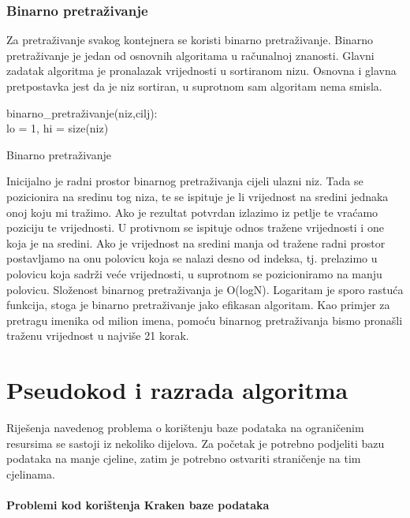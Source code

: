 \documentclass[times, utf8, zavrsni]{fer}
\begin{document}
{\subsection{Binarno pretraživanje}
Za pretraživanje svakog kontejnera se koristi binarno pretraživanje. Binarno pretraživanje je jedan od osnovnih algoritama u računalnoj znanosti. Glavni zadatak algoritma je pronalazak vrijednosti u sortiranom nizu. Osnovna i glavna pretpostavka jest da je niz sortiran, u suprotnom sam algoritam nema smisla.
\newline
\newline
\begin{algorithm}[H]
	binarno\_pretraživanje(niz,cilj):\\
	lo = 1, hi = size(niz)\;
	\caption{Binarno pretraživanje}
	\label{BinarnoP}
\end{algorithm}

Inicijalno je radni prostor binarnog pretraživanja cijeli ulazni niz. Tada se pozicionira na sredinu tog niza, te se ispituje je li vrijednost na sredini jednaka onoj koju mi tražimo. Ako je rezultat potvrdan izlazimo iz petlje te vraćamo poziciju te vrijednosti. U protivnom se ispituje odnos tražene vrijednosti i one koja je na sredini. Ako je vrijednost na sredini manja od tražene radni prostor postavljamo na onu polovicu koja se nalazi desno od indeksa, tj. prelazimo u  polovicu koja sadrži veće vrijednosti, u suprotnom se pozicioniramo na manju polovicu. Složenost binarnog pretraživanja je O(logN). Logaritam je sporo rastuća funkcija, stoga je binarno pretraživanje jako efikasan algoritam. Kao primjer za pretragu imenika od milion imena, pomoću binarnog pretraživanja bismo pronašli traženu vrijednost u najviše 21 korak.


\chapter{Pseudokod i razrada algoritma}
Riješenja navedenog problema o korištenju baze podataka na ograničenim resursima se sastoji iz nekoliko dijelova. Za početak je potrebno podjeliti bazu podataka na manje cjeline, zatim je potrebno ostvariti straničenje na tim cjelinama.
\subsubsection{Problemi kod korištenja Kraken baze podataka}

}
\end{document}

